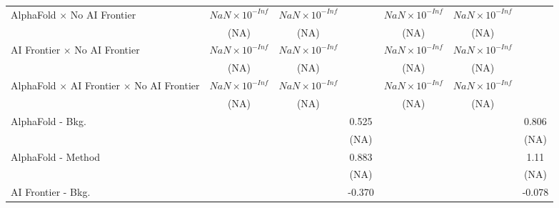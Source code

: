 \begin{tabular}{lcccccc}
   AlphaFold $\times$ No AI Frontier                                          & $NaN\times 10^{-Inf}$  & $NaN\times 10^{-Inf}$  &                        & $NaN\times 10^{-Inf}$  & $NaN\times 10^{-Inf}$  &   \\   
                                                                              & (NA)                   & (NA)                   &                        & (NA)                   & (NA)                   &   \\   
   AI Frontier $\times$ No AI Frontier                                        & $NaN\times 10^{-Inf}$  & $NaN\times 10^{-Inf}$  &                        & $NaN\times 10^{-Inf}$  & $NaN\times 10^{-Inf}$  &   \\   
                                                                              & (NA)                   & (NA)                   &                        & (NA)                   & (NA)                   &   \\   
   AlphaFold $\times$ AI Frontier $\times$ No AI Frontier                     & $NaN\times 10^{-Inf}$  & $NaN\times 10^{-Inf}$  &                        & $NaN\times 10^{-Inf}$  & $NaN\times 10^{-Inf}$  &   \\   
                                                                              & (NA)                   & (NA)                   &                        & (NA)                   & (NA)                   &   \\   
   AlphaFold - Bkg.                                                           &                        &                        & 0.525                  &                        &                        & 0.806\\   
                                                                              &                        &                        & (NA)                   &                        &                        & (NA)\\   
   AlphaFold - Method                                                         &                        &                        & 0.883                  &                        &                        & 1.11\\   
                                                                              &                        &                        & (NA)                   &                        &                        & (NA)\\   
   AI Frontier - Bkg.                                                         &                        &                        & -0.370                 &                        &                        & -0.078\\   

\end{tabular}
